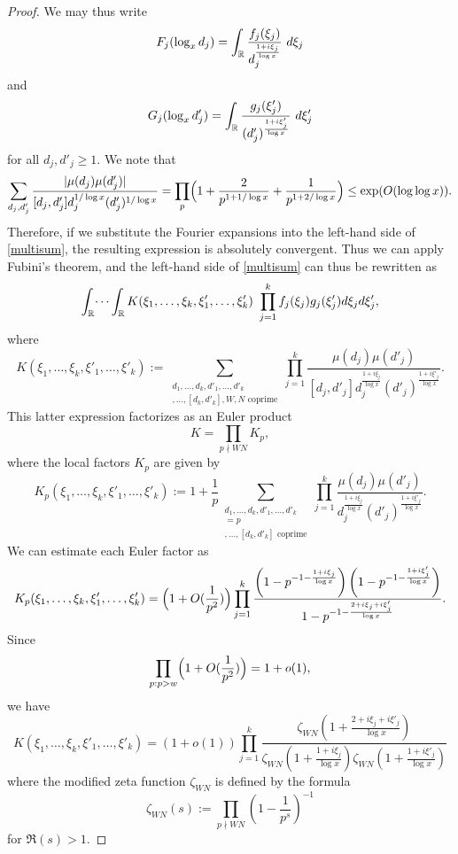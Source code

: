 \begin{proof}
We may thus write
$$ F_j( \log_x d_j ) = \int_\R \frac{f_j(\xi_j)}{d_j^{\frac{1+i\xi_j}{\log x}}}\ d\xi_j$$
and
$$ G_j( \log_x d'_j ) = \int_\R \frac{g_j(\xi'_j)}{(d'_j)^{\frac{1+i\xi'_j}{\log x}}}\ d\xi'_j$$
for all $d_j,d'_j \geq 1$.
We note that
$$ \sum_{d_j,d_j'}\frac{|\mu(d_j)\mu(d_j')|}{[d_j,d_j']d_j^{1/\log{x}}(d_j')^{1/\log{x}}}= \prod_{p}\Bigl(1+\frac{2}{p^{1+1/\log{x}}}+\frac{1}{p^{1+2/\log{x}}}\Bigr)\le \exp(O(\log\log{x})).$$
Therefore, if we substitute the Fourier expansions into the left-hand side of \eqref{multisum}, the resulting expression is absolutely convergent. Thus we can apply Fubini's theorem, and the left-hand side of \eqref{multisum} can thus be rewritten as
\begin{equation}\label{fg-int}
 \int_\R \dots \int_\R K(\xi_1,\dots,\xi_k,\xi'_1,\dots,\xi'_k)\ \prod_{j=1}^k f_j(\xi_j) g_j(\xi'_j) d\xi_j d\xi'_j,
\end{equation}
where
$$ K(\xi_1,\dots,\xi_k,\xi'_1,\dots,\xi'_k) := 
\sum_{\substack{d_1, \dots, d_k, d'_1, \dots, d'_k \\ [d_1,d'_1], \dots, [d_k,d'_k], W, N \text{ coprime}}} 
\prod_{j=1}^k \frac{\mu(d_j) \mu(d'_j)}{[d_j,d'_j] d_j^{\frac{1+i\xi_j}{\log x}} (d'_j)^{\frac{1+i\xi'_j}{\log x}}}.$$
This latter expression factorizes as an Euler product 
$$ K = \prod_{p\nmid WN} K_p, $$
where the local factors $K_p$ are given by
\begin{equation}\label{kp}
 K_p(\xi_1,\dots,\xi_k,\xi'_1,\dots,\xi'_k)
 := 1 + \frac{1}{p}
\sum_{\substack{d_1,\dots,d_k,d'_1,\dots,d'_k \\ [d_1, \dots, d_k, d'_1, \dots, d'_k]=p \\ [d_1,d'_1],\dots,[d_k,d'_k] \text{ coprime}}} 
\prod_{j=1}^k \frac{\mu(d_j) \mu(d'_j)}{d_j^{\frac{1+i\xi_j}{\log x}} (d'_j)^{\frac{1+i\xi'_j}{\log x}}}.
\end{equation}
We can estimate each Euler factor as
\begin{equation}\label{kp-est}
 K_p(\xi_1,\dots,\xi_k,\xi'_1,\dots,\xi'_k) = \Bigl(1+O(\frac{1}{p^2})\Bigr) \prod_{j=1}^k \frac{\left(1 - p^{-1-\frac{1+i\xi_j}{\log x}}\right)\left(1 - p^{-1-\frac{1+i\xi'_j}{\log x}}\right)}{1 - p^{-1-\frac{2+i\xi_j+i\xi'_j}{\log x}}}.
\end{equation}
Since 
$$ 
\prod_{p: p>w} \Bigl(1 + O(\frac{1}{p^2})\Bigr) = 1 + o(1),$$
we have
$$
 K(\xi_1,\dots,\xi_k,\xi'_1,\dots,\xi'_k) = (1+o(1)) \prod_{j=1}^k \frac{ \zeta_{W N}( 1 + \frac{2+i\xi_j+i\xi'_j}{\log x}) }{ \zeta_{W N}(1 + \frac{1+i\xi_j}{\log x}) \zeta_{W N}(1 + \frac{1+i\xi'_j}{\log x}) } $$
where the modified zeta function $\zeta_{WN}$ is defined by the formula
$$ \zeta_{W N}(s) := \prod_{p\nmid W N} \left(1-\frac{1}{p^s}\right)^{-1}$$
for $\Re(s) > 1$.  


\end{proof}
